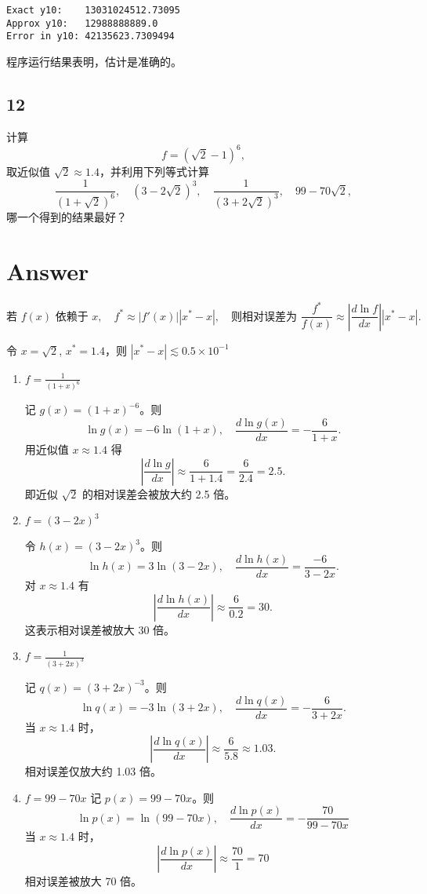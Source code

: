 \documentclass[11pt]{article}
\begin{document}
    \begin{Verbatim}[commandchars=\\\{\}]
Exact y10:    13031024512.73095
Approx y10:   12988888889.0
Error in y10: 42135623.7309494
    \end{Verbatim}

    程序运行结果表明，估计是准确的。

    \subsection{12}\label{section}

计算\\
\[
f = (\sqrt{2}-1)^6,
\] 取近似值 \(\sqrt{2}\approx 1.4\)，并利用下列等式计算\\
\[
\frac{1}{(1+\sqrt{2})^6},\quad (3-2\sqrt{2})^3,\quad \frac{1}{(3+2\sqrt{2})^3},\quad 99-70\sqrt{2},
\] 哪一个得到的结果最好？

\section{Answer}\label{answer}

\[
\text{若 } f(x) \text{ 依赖于 } x,\quad f^* \approx |f'(x)||x^*-x|,\quad \text{则相对误差为 } \frac{f^*}{f(x)}\approx\left|\frac{d\ln f}{dx}\right||x^*-x|.
\]

令 \(x=\sqrt{2}\), \(x^* = 1.4\)，则
\(|x^*-x|\lesssim 0.5\times10^{-1}\)

\begin{enumerate}
\def\labelenumi{\arabic{enumi}.}
\item
  \textbf{\(f=\frac{1}{(1+x)^6}\)}

  记 \(g(x)=(1+x)^{-6}\)。则 \[
  \ln g(x)=-6\ln(1+x),\quad \frac{d\ln g(x)}{dx}=-\frac{6}{1+x}.
  \] 用近似值 \(x\approx1.4\) 得 \[
  \left|\frac{d\ln g}{dx}\right|\approx \frac{6}{1+1.4}=\frac{6}{2.4}=2.5.
  \] 即近似 \(\sqrt{2}\) 的相对误差会被放大约 2.5 倍。
\item
  \textbf{\(f=(3-2x)^3\)}

  令 \(h(x)=(3-2x)^3\)。则 \[
  \ln h(x)=3\ln(3-2x),\quad \frac{d\ln h(x)}{dx}=\frac{-6}{3-2x}.
  \] 对 \(x\approx1.4\) 有 \[
  \left|\frac{d\ln h(x)}{dx}\right|\approx \frac{6}{0.2}=30.
  \] 这表示相对误差被放大 30 倍。
\item
  \textbf{\(f=\frac{1}{(3+2x)^3}\)}

  记 \(q(x)=(3+2x)^{-3}\)。则 \[
  \ln q(x)=-3\ln(3+2x),\quad \frac{d\ln q(x)}{dx}=-\frac{6}{3+2x}.
  \] 当 \(x\approx1.4\) 时， \[
  \left|\frac{d\ln q(x)}{dx}\right|\approx \frac{6}{5.8}\approx 1.03.
  \] 相对误差仅放大约 1.03 倍。
\item
  \textbf{\(f=99-70x\)} 记 \(p(x) = 99-70x\)。则 \[
  \ln p(x) = \ln(99 -70x), \quad \frac{d\ln p(x)}{dx} = -\frac{70}{99-70x}
  \] 当 \(x\approx 1.4\) 时， \[
  \left|\frac{d\ln p(x)}{dx}\right|\approx \frac{70}{1}=70
  \] 相对误差被放大 70 倍。
\end{enumerate}
\end{document}
